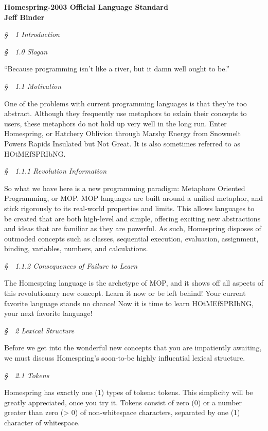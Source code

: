 \documentclass[10pt]{article}
\begin{document}
\setlength\parindent{0pt}
\setlength\parskip{\smallskipamount}

\newcommand{\sect}[1]{
  \vspace{\bigskipamount}
  \hspace{-0.3in}
  \textit{\S~~#1}
}

\textbf{Homespring-2003 Official Language Standard\\Jeff Binder}

\sect{1 Introduction}

\sect{1.0 Slogan}

``Because programming isn't like a river, but it damn well ought to be.''

\sect{1.1 Motivation}

One of the problems with current programming languages is that they're too abstract. Although they frequently use metaphors to exlain their concepts to users, these metaphors do not hold up very well in the long run. Enter Homespring, or Hatchery Oblivion through Marshy Energy from Snowmelt Powers Rapids Insulated but Not Great. It is also sometimes referred to as HOtMEfSPRIbNG.

\sect{1.1.1 Revolution Information}

So what we have here is a new programming paradigm: Metaphore Oriented Programming, or MOP. MOP languages are built around a unified metaphor, and stick rigorously to its real-world properties and limits. This allows languages to be created that are both high-level and simple, offering exciting new abstractions and ideas that are familiar as they are powerful. As such, Homespring disposes of outmoded concepts such as classes, sequential execution, evaluation, assignment, binding, variables, numbers, and calculations.

\sect{1.1.2 Consequences of Failure to Learn}

The Homespring language is the archetype of MOP, and it shows off all aspects of this revolutionary new concept. Learn it now or be left behind! Your current favorite language stands no chance! Now it is time to learn HOtMEfSPRIbNG, your next favorite language!

\sect{2 Lexical Structure}

Before we get into the wonderful new concepts that you are impatiently awaiting, we must discuss Homespring's soon-to-be highly influential lexical structure.

\sect{2.1 Tokens}

Homespring has exactly one (1) types of tokens: tokens. This simplicity will be greatly appreciated, once you try it. Tokens consist of zero (0) or a number greater than zero (> 0) of non-whitespace characters, separated by one (1) character of whitespace.
\end{document}
